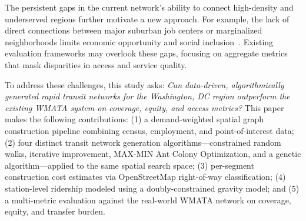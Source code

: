 \documentclass[sigconf,nonacm]{acmart}
\begin{document}
The persistent gaps in the current network's ability to connect high-density and underserved regions further motivate a new approach. For example, the lack of direct connections between major suburban job centers or marginalized neighborhoods limits economic opportunity and social inclusion~\cite{lit:equity}. Existing evaluation frameworks may overlook these gaps, focusing on aggregate metrics that mask disparities in access and service quality.

To address these challenges, this study asks: \textit{Can data-driven, algorithmically generated rapid transit networks for the Washington, DC region outperform the existing WMATA system on coverage, equity, and access metrics?} This paper makes the following contributions: (1) a demand-weighted spatial graph construction pipeline combining census, employment, and point-of-interest data; (2) four distinct transit network generation algorithms---constrained random walks, iterative improvement, MAX-MIN Ant Colony Optimization, and a genetic algorithm---applied to the same spatial search space; (3) per-segment construction cost estimates via OpenStreetMap right-of-way classification; (4) station-level ridership modeled using a doubly-constrained gravity model; and (5) a multi-metric evaluation against the real-world WMATA network on coverage, equity, and transfer burden.




\begin{table}[h]
\caption{Counties and County-Equivalents in the Study Area}
\label{tab:counties}
\end{table}
\end{document}
